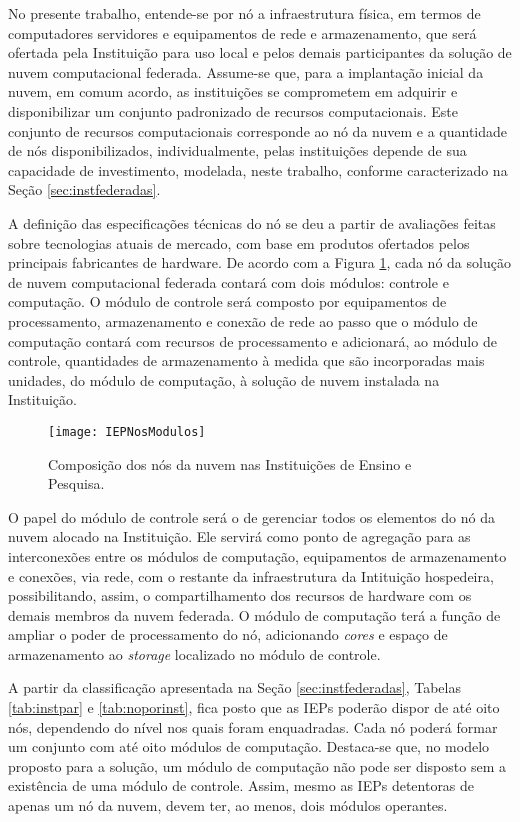 \documentclass[tese,capa]{texufpel}
\begin{document}
No presente trabalho, entende-se por nó a infraestrutura física, em termos de computadores servidores e equipamentos de rede e armazenamento, que será ofertada pela Instituição para uso local e pelos demais participantes da solução de nuvem computacional federada. Assume-se que, para a implantação inicial da nuvem, em comum acordo, as instituições se comprometem em adquirir e disponibilizar um conjunto padronizado de recursos computacionais. Este conjunto de recursos computacionais corresponde ao nó da nuvem e a quantidade de nós disponibilizados, individualmente, pelas instituições depende de sua capacidade de investimento, modelada, neste trabalho, conforme caracterizado na Seção \ref{sec:instfederadas}.

A definição das especificações técnicas do nó se deu a partir de avaliações feitas sobre tecnologias atuais de mercado, com base em produtos ofertados pelos principais fabricantes de hardware. De acordo com a Figura \ref{fig:IEPNosModulos}, cada nó da solução de nuvem computacional federada contará com dois módulos: controle e computação. O módulo de controle será composto por equipamentos de processamento, armazenamento e conexão de rede ao passo que o módulo de computação contará com recursos de processamento e adicionará, ao módulo de controle, quantidades de armazenamento à medida que são incorporadas mais unidades, do módulo de computação, à solução de nuvem instalada na Instituição.

\begin{figure}[H]
	\centering 
	\texttt{[image: IEPNosModulos]}
	\caption[Composição dos nós da nuvem nas Instituições de Ensino e Pesquisa.]{Composição dos nós da nuvem nas Instituições de Ensino e Pesquisa.} 
	\label{fig:IEPNosModulos}
\end{figure}

O papel do módulo de controle será o de gerenciar todos os elementos do nó da nuvem alocado na Instituição. Ele servirá como ponto de agregação para as interconexões entre os módulos de computação, equipamentos de armazenamento e conexões, via rede, com o restante da infraestrutura da Intituição hospedeira, possibilitando, assim, o compartilhamento dos recursos de hardware com os demais membros da nuvem federada. O módulo de computação terá a função de ampliar o poder de processamento do nó, adicionando \emph{cores} e espaço de armazenamento ao \emph{storage} localizado no módulo de controle.

A partir da classificação apresentada na Seção \ref{sec:instfederadas}, Tabelas \ref{tab:instpar} e \ref{tab:noporinst}, fica posto que as IEPs poderão dispor de até oito nós, dependendo do nível nos quais foram enquadradas. Cada nó poderá formar um conjunto com até oito módulos de computação. Destaca-se que, no modelo proposto para a solução, um módulo de computação não pode ser disposto sem a existência de uma módulo de controle. Assim, mesmo as IEPs detentoras de apenas um nó da nuvem, devem ter, ao menos, dois módulos operantes.
\end{document}
